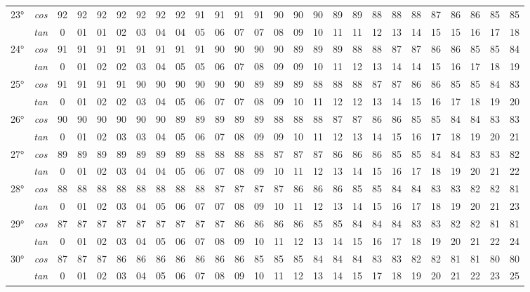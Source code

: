 \begin{tiny}
\begin{longtable}{c c |c |c |c |c |c |c |c |c |c |c |c |c |c |c |c |c |c |c |c |c |c |c |c |c}
		\multirow{2}{*}{23°}&\textit{cos}& 92& 92& 92& 92& 92& 92& 92& 91& 91& 91& 91& 90& 90& 90& 89& 89& 88& 88& 88& 87& 86& 86& 85& 85\\* \space&\textit{tan} & 0 & 01 & 01 & 02 & 03 & 04 & 04 & 05 & 06 & 07 & 07 & 08 & 09& 10& 11& 11& 12& 13& 14& 15& 15& 16& 17& 18\\\hline
		\multirow{2}{*}{24°}&\textit{cos}& 91& 91& 91& 91& 91& 91& 91& 91& 90& 90& 90& 90& 89& 89& 89& 88& 88& 87& 87& 86& 86& 85& 85& 84\\* \space&\textit{tan} & 0 & 01 & 02 & 02 & 03 & 04 & 05 & 05 & 06 & 07 & 08 & 09 & 09& 10& 11& 12& 13& 14& 14& 15& 16& 17& 18& 19\\\hline
		\multirow{2}{*}{25°}&\textit{cos}& 91& 91& 91& 91& 90& 90& 90& 90& 90& 90& 89& 89& 89& 88& 88& 88& 87& 87& 86& 86& 85& 85& 84& 83\\* \space&\textit{tan} & 0 & 01 & 02 & 02 & 03 & 04 & 05 & 06 & 07 & 07 & 08 & 09& 10& 11& 12& 12& 13& 14& 15& 16& 17& 18& 19& 20\\\hline
		\multirow{2}{*}{26°}&\textit{cos}& 90& 90& 90& 90& 90& 90& 89& 89& 89& 89& 89& 88& 88& 88& 87& 87& 86& 86& 85& 85& 84& 84& 83& 83\\* \space&\textit{tan} & 0 & 01 & 02 & 03 & 03 & 04 & 05 & 06 & 07 & 08 & 09 & 09& 10& 11& 12& 13& 14& 15& 16& 17& 18& 19& 20& 21\\\hline
		\multirow{2}{*}{27°}&\textit{cos}& 89& 89& 89& 89& 89& 89& 89& 88& 88& 88& 88& 87& 87& 87& 86& 86& 86& 85& 85& 84& 84& 83& 83& 82\\* \space&\textit{tan} & 0 & 01 & 02 & 03 & 04 & 04 & 05 & 06 & 07 & 08 & 09& 10& 11& 12& 13& 14& 15& 16& 17& 18& 19& 20& 21& 22\\\hline
		\multirow{2}{*}{28°}&\textit{cos}& 88& 88& 88& 88& 88& 88& 88& 88& 87& 87& 87& 87& 86& 86& 86& 85& 85& 84& 84& 83& 83& 82& 82& 81\\* \space&\textit{tan} & 0 & 01 & 02 & 03 & 04 & 05 & 06 & 07 & 07 & 08 & 09& 10& 11& 12& 13& 14& 15& 16& 17& 18& 19& 20& 21& 23\\\hline
		\multirow{2}{*}{29°}&\textit{cos}& 87& 87& 87& 87& 87& 87& 87& 87& 87& 86& 86& 86& 86& 85& 85& 84& 84& 84& 83& 83& 82& 82& 81& 81\\* \space&\textit{tan} & 0 & 01 & 02 & 03 & 04 & 05 & 06 & 07 & 08 & 09& 10& 11& 12& 13& 14& 15& 16& 17& 18& 19& 20& 21& 22& 24\\\hline
		\multirow{2}{*}{30°}&\textit{cos}& 87& 87& 87& 86& 86& 86& 86& 86& 86& 86& 85& 85& 85& 84& 84& 84& 83& 83& 82& 82& 81& 81& 80& 80\\* \space&\textit{tan} & 0 & 01 & 02 & 03 & 04 & 05 & 06 & 07 & 08 & 09& 10& 11& 12& 13& 14& 15& 17& 18& 19& 20& 21& 22& 23& 25\\\hline

\end{longtable}
\end{tiny}
